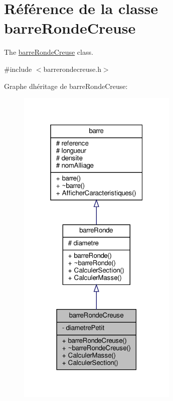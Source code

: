 \hypertarget{classbarre_ronde_creuse}{}\section{Référence de la classe barre\+Ronde\+Creuse}
\label{classbarre_ronde_creuse}


The \hyperlink{classbarre_ronde_creuse}{barre\+Ronde\+Creuse} class.  




{\ttfamily \#include $<$barrerondecreuse.\+h$>$}



Graphe d\textquotesingle{}héritage de barre\+Ronde\+Creuse\+:
\nopagebreak
\begin{figure}[H]
\begin{center}
\leavevmode
\includegraphics[width=217pt]{classbarre_ronde_creuse__inherit__graph}
\end{center}
\end{figure}


